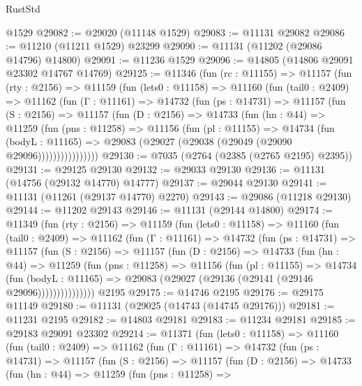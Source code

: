 \begin{lexlean}{RustStd}
\begin{coremodule}
    @1529
@29082 := @29020 (@11148 @1529)
@29083 := @11131 @29082
@29086 := @11210 (@11211 @1529) @23299
@29090 := @11131 (@11202 (@29086 @14796) @14800)
@29091 := @11236 @1529
@29096 := @14805 (@14806 @29091 @23302 @14767 @14769)
@29125 := @11346
    (fun (rc : @11155) =>
    @11157
      (fun (rty : @2156) =>
      @11159
        (fun (lets0 : @11158) =>
        @11160
          (fun (tail0 : @2409) =>
          @11162
            (fun (Γ : @11161) =>
            @14732
              (fun (ps : @14731) =>
              @11157
                (fun (S : @2156) =>
                @11157
                  (fun (D : @2156) =>
                  @14733
                    (fun (hn : @44) =>
                    @11259
                      (fun (pns : @11258) =>
                      @11156
                        (fun (pl : @11155) =>
                        @14734
                          (fun (bodyL : @11165) =>
                          @29083 (@29027 (@29038 (@29049 (@29090 @29096))))))))))))))))
@29130 := @7035 (@2764 (@2385 (@2765 @2195) @2395))
@29131 := @29125 @29130
@29132 := @29033 @29130
@29136 := @11131 (@14756 (@29132 @14770) @14777)
@29137 := @29044 @29130
@29141 := @11131 (@11261 (@29137 @14770) @2270)
@29143 := @29086 (@11218 @29130)
@29144 := @11202 @29143
@29146 := @11131 (@29144 @14800)
@29174 := @11349
    (fun (rty : @2156) =>
    @11159
      (fun (lets0 : @11158) =>
      @11160
        (fun (tail0 : @2409) =>
        @11162
          (fun (Γ : @11161) =>
          @14732
            (fun (ps : @14731) =>
            @11157
              (fun (S : @2156) =>
              @11157
                (fun (D : @2156) =>
                @14733
                  (fun (hn : @44) =>
                  @11259
                    (fun (pns : @11258) =>
                    @11156
                      (fun (pl : @11155) =>
                      @14734
                        (fun (bodyL : @11165) =>
                        @29083 (@29027 (@29136 (@29141 (@29146 @29096)))))))))))))))
    @2195
@29175 := @14746 @2195
@29176 := @29175 @11149
@29180 := @11131 (@29025 (@14743 (@14745 @29176)))
@29181 := @11231 @2195
@29182 := @14803 @29181
@29183 := @11234 @29181
@29185 := @29183 @29091 @23302
@29214 := @11371
    (fun (lets0 : @11158) =>
    @11160
      (fun (tail0 : @2409) =>
      @11162
        (fun (Γ : @11161) =>
        @14732
          (fun (ps : @14731) =>
          @11157
            (fun (S : @2156) =>
            @11157
              (fun (D : @2156) =>
              @14733
                (fun (hn : @44) =>
                @11259
                  (fun (pns : @11258) =>

\end{coremodule}
\end{lexlean}

